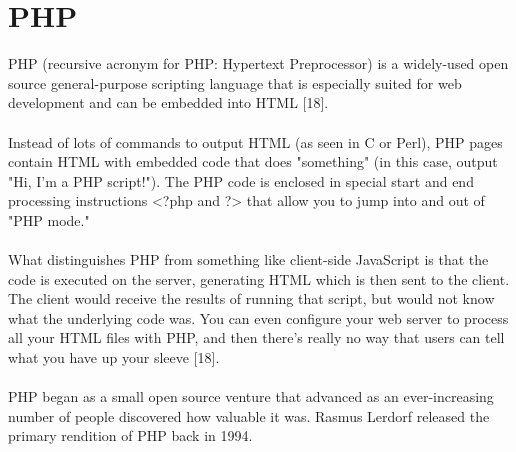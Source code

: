 \documentclass[thesis.tex]{subfiles}
\begin{document}
\section{PHP}
PHP (recursive acronym for PHP: Hypertext Preprocessor) is a widely-used open source general-purpose scripting language that is especially suited for web development and can be embedded into HTML [18].
\paragraph{}
Instead of lots of commands to output HTML (as seen in C or Perl), PHP pages contain HTML with embedded code that does "something" (in this case, output "Hi, I'm a PHP script!"). The PHP code is enclosed in special start and end processing instructions <?php and ?> that allow you to jump into and out of "PHP mode."
\paragraph{}
What distinguishes PHP from something like client-side JavaScript is that the code is executed on the server, generating HTML which is then sent to the client. The client would receive the results of running that script, but would not know what the underlying code was. You can even configure your web server to process all your HTML files with PHP, and then there's really no way that users can tell what you have up your sleeve [18].
\paragraph{}
PHP began as a small open source venture that advanced as an ever-increasing number of people discovered how valuable it was. Rasmus Lerdorf released the primary rendition of PHP back in 1994.
\end{document}
